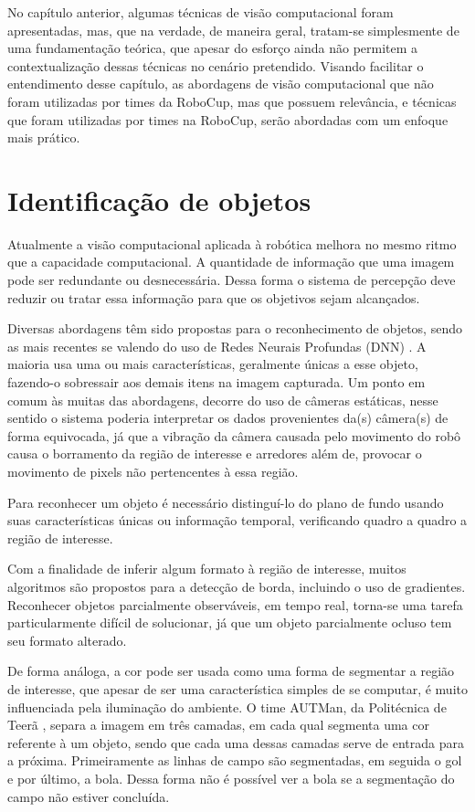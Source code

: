 No capítulo anterior, algumas técnicas de visão computacional foram apresentadas, mas, que na verdade, de maneira geral, tratam-se simplesmente de uma fundamentação teórica, que apesar do esforço ainda não permitem a contextualização dessas técnicas no cenário pretendido. 
Visando facilitar o entendimento desse capítulo, as abordagens de visão computacional que não foram utilizadas por times da RoboCup, mas que possuem relevância, e técnicas que foram utilizadas por times na RoboCup, serão abordadas com um enfoque mais prático.  

\section{Identificação de objetos}

Atualmente a visão computacional aplicada à robótica melhora no mesmo ritmo que a capacidade computacional. A quantidade de informação que uma imagem pode ser redundante ou desnecessária. Dessa forma o sistema de percepção deve reduzir ou tratar essa informação para que os objetivos sejam alcançados. 

Diversas abordagens têm sido propostas para o reconhecimento de objetos, sendo as mais recentes se valendo do uso de Redes Neurais Profundas (DNN) \cite{Deep1} \cite{Deep2} \cite{mccannobject}. A maioria usa uma ou mais características, geralmente únicas a esse objeto, fazendo-o sobressair aos demais itens na imagem capturada. Um ponto em comum às muitas das abordagens, decorre do uso de câmeras estáticas, nesse sentido o sistema poderia interpretar os dados provenientes da(s) câmera(s) de forma equivocada, já que a vibração da câmera causada pelo movimento do robô causa o borramento da região de interesse e arredores além de, provocar o movimento de pixels não pertencentes à essa região. 

Para reconhecer um objeto é necessário distinguí-lo do plano de fundo usando suas características únicas ou informação temporal, verificando quadro a quadro a região de interesse.

Com a finalidade de inferir algum formato à região de interesse, muitos algoritmos são propostos para a detecção de borda, incluindo o uso de gradientes. Reconhecer objetos parcialmente observáveis, em tempo real, torna-se uma tarefa particularmente difícil de  solucionar, já que um objeto parcialmente ocluso tem seu formato alterado. 

De forma análoga, a cor pode ser usada como uma forma de segmentar a região de interesse, que apesar de ser uma característica simples de se computar, é muito influenciada pela iluminação do ambiente. O time AUTMan, da Politécnica de Teerã \cite{AUTMan}, separa a imagem em três camadas, em cada qual segmenta uma cor referente à um objeto, sendo que cada uma dessas camadas serve de entrada para a próxima. Primeiramente as linhas de campo são segmentadas, em seguida o gol e por último, a bola. Dessa forma não é possível ver a bola se a segmentação do campo não estiver concluída. 

